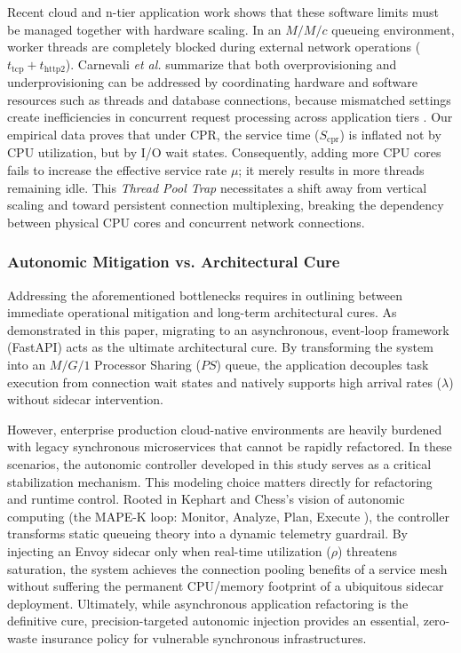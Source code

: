 \documentclass{ieeeaccess}
\begin{document}
	Recent cloud and n-tier application work shows that these software limits must be managed together with hardware scaling. In an $M/M/c$ queueing environment, worker threads are completely blocked during external network operations ($t_{\text{tcp}} + t_{\text{http2}}$). Carnevali \emph{et al.} summarize that both overprovisioning and underprovisioning can be addressed by coordinating hardware and software resources such as threads and database connections, because mismatched settings create inefficiencies in concurrent request processing across application tiers \cite{carnevali2025compositional}. Our empirical data proves that under CPR, the service time ($S_{\text{cpr}}$) is inflated not by CPU utilization, but by I/O wait states. Consequently, adding more CPU cores fails to increase the effective service rate $\mu$; it merely results in more threads remaining idle. This \textit{Thread Pool Trap} necessitates a shift away from vertical scaling and toward persistent connection multiplexing, breaking the dependency between physical CPU cores and concurrent network connections.
	
	\subsubsection{Autonomic Mitigation vs. Architectural Cure}
	Addressing the aforementioned bottlenecks requires in outlining between immediate operational mitigation and long-term architectural cures. As demonstrated in this paper, migrating to an asynchronous, event-loop framework (FastAPI) acts as the ultimate architectural cure. By transforming the system into an $M/G/1$ Processor Sharing ($PS$) queue, the application decouples task execution from connection wait states and natively supports high arrival rates ($\lambda$) without sidecar intervention.
	
	However, enterprise production cloud-native environments are heavily burdened with legacy synchronous microservices that cannot be rapidly refactored. In these scenarios, the autonomic controller developed in this study serves as a critical stabilization mechanism. This modeling choice matters directly for refactoring and runtime control. Rooted in Kephart and Chess’s vision of autonomic computing \cite{kephart2003vision} (the MAPE-K loop: Monitor, Analyze, Plan, Execute \cite{armstrong2017towards}), the controller transforms static queueing theory into a dynamic telemetry guardrail. By injecting an Envoy sidecar only when real-time utilization ($\rho$) threatens saturation, the system achieves the connection pooling benefits of a service mesh without suffering the permanent CPU/memory footprint of a ubiquitous sidecar deployment. Ultimately, while asynchronous application refactoring is the definitive cure, precision-targeted autonomic injection provides an essential, zero-waste insurance policy for vulnerable synchronous infrastructures.
	
\end{document}
